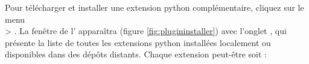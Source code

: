 Pour télécharger et installer une extension python complémentaire, cliquez sur le menu\\ 
 > .
La fenêtre de l' apparaîtra (figure 
\ref{fig:plugininstaller}) avec l'onglet , qui présente la liste 
de toutes les extensions python installées localement ou disponibles dans des 
dépôts distants. Chaque extension peut-être soit :

